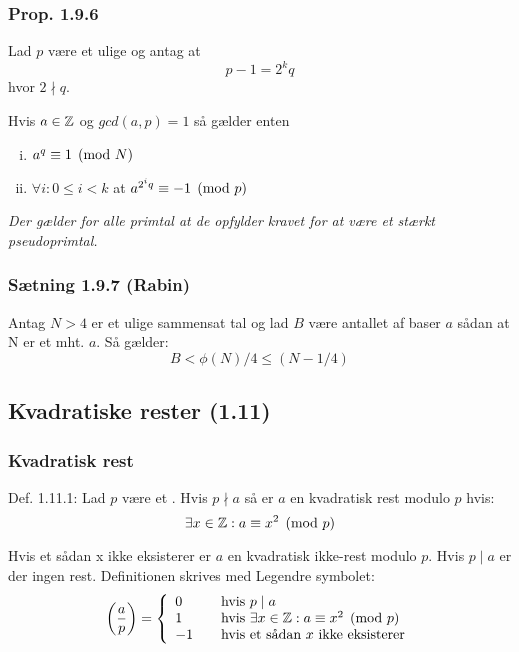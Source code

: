 \subsubsection{Prop. 1.9.6}
Lad $p$ være et ulige  og antag at
\begin{equation*}
  p - 1 = 2^k q
\end{equation*}
hvor $2 \nmid q$.

Hvis $a \in \mathbb{Z}$ og $gcd(a, p) = 1$ så gælder enten
\begin{enumerate}[(i)]
  \item $a^q \equiv 1 \pmod{N}$
  \item $\forall i: 0 \leq i < k$ at $a^{2^{i}q}\equiv -1 \pmod{p}$
\end{enumerate}
\textit{Der gælder for alle primtal at de opfylder kravet for at være et stærkt
pseudoprimtal.}

\subsubsection{Sætning 1.9.7 (Rabin)}
Antag $N > 4$ er et ulige sammensat tal og lad $B$ være antallet af baser $a$
sådan at N er et  mht. $a$. Så gælder:
\begin{equation*}
  B < \phi(N) / 4 \leq (N - 1 / 4)
\end{equation*}


\subsection{Kvadratiske rester (1.11)}
\subsubsection{Kvadratisk rest}
\label{Kvadratisk rest}
Def. 1.11.1: Lad $p$ være et . Hvis $p \nmid a$ så er $a$ en
kvadratisk rest modulo $p$ hvis:
\begin{equation*}
  \exists x \in \mathbb{Z}: a \equiv x^2 \pmod{p}
\end{equation*}

Hvis et sådan x ikke eksisterer er $a$ en kvadratisk ikke-rest modulo $p$. Hvis
$p \mid a$ er der ingen rest. Definitionen skrives med Legendre symbolet:
\begin{equation*}
  \left(\frac{a}{p}\right) = \left\{
\begin{array}{l l}
0 & \quad \text{hvis $p \mid a$}\\
1 & \quad \text{hvis $\exists x \in \mathbb{Z}: a \equiv x^2 \pmod{p}$}\\
-1 & \quad \text{hvis et sådan $x$ ikke eksisterer}
\end{array} \right.
\end{equation*}

